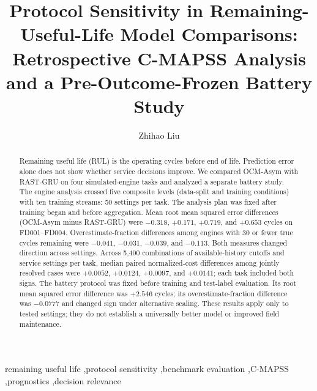 \documentclass[preprint,12pt,numbers,sort&compress]{elsarticle}
\begin{document}

\begin{frontmatter}
\title{Protocol Sensitivity in Remaining-Useful-Life Model Comparisons: Retrospective C-MAPSS Analysis and a Pre-Outcome-Frozen Battery Study}
\author[aff1]{Zhihao Liu}
\address[aff1]{Independent Researcher, China}
\begin{abstract}
Remaining useful life (RUL) is the operating cycles before end of life. Prediction error alone does not show whether service decisions improve. We compared OCM-Asym with RAST-GRU on four simulated-engine tasks and analyzed a separate battery study. The engine analysis crossed five composite levels (data-split and training conditions) with ten training streams: 50 settings per task. The analysis plan was fixed after training began and before aggregation. Mean root mean squared error differences (OCM-Asym minus RAST-GRU) were $-0.318$, $+0.171$, $+0.719$, and $+0.653$ cycles on FD001--FD004. Overestimate-fraction differences among engines with 30 or fewer true cycles remaining were $-0.041$, $-0.031$, $-0.039$, and $-0.113$. Both measures changed direction across settings. Across 5,400 combinations of available-history cutoffs and service settings per task, median paired normalized-cost differences among jointly resolved cases were $+0.0052$, $+0.0124$, $+0.0097$, and $+0.0141$; each task included both signs. The battery protocol was fixed before training and test-label evaluation. Its root mean squared error difference was $+2.546$ cycles; its overestimate-fraction difference was $-0.0777$ and changed sign under alternative scaling. These results apply only to tested settings; they do not establish a universally better model or improved field maintenance.
\end{abstract}
\begin{keyword}
remaining useful life \sep protocol sensitivity \sep benchmark evaluation \sep C-MAPSS \sep prognostics \sep decision relevance
\end{keyword}
\end{frontmatter}
\end{document}
